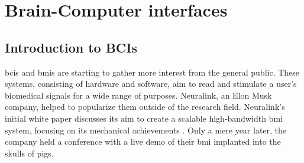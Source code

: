 




\glsresetall

\chapter{Brain-Computer interfaces}
\label{ch:bci}


\section{Introduction to BCIs}
\label{sec:bci_introduction}

\Glspl{bci} and \glspl{bmi} are starting to gather more interest from the general public.
These systems, consisting of hardware and software, aim to read and stimulate a user's biomedical signals for a wide range of purposes.
Neuralink, an Elon Musk company, helped to popularize them outside of the research field.
Neuralink's initial white paper discusses its aim to create a scalable high-bandwidth \gls{bmi} system, focusing on its mechanical achievements \citep{neuralink_whitepaper}.
Only a mere year later, the company held a conference with a live demo of their \gls{bmi} implanted into the skulls of pigs.

